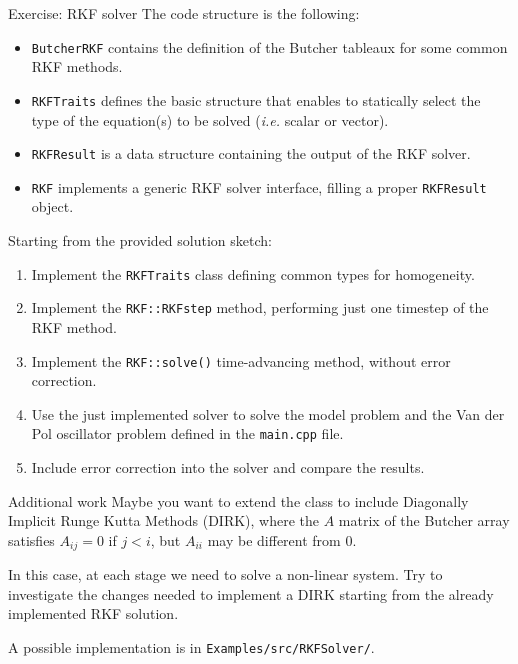 \documentclass[10pt]{beamer}
\begin{document}
\begin{frame}{Exercise: RKF solver}
The code structure is the following:
\begin{itemize}
\item \texttt{ButcherRKF} contains the definition of the Butcher tableaux for some common RKF methods.
\item \texttt{RKFTraits} defines the basic structure that enables to statically select the type of the equation(s) to be solved (\textit{i.e.} scalar or vector).
\item \texttt{RKFResult} is a data structure containing the output of the RKF solver.
\item \texttt{RKF} implements a generic RKF solver interface, filling a proper \texttt{RKFResult} object.
\end{itemize}
\vfill
Starting from the provided solution sketch:
\begin{enumerate}
\item Implement the \texttt{RKFTraits} class defining common types for homogeneity.
\item Implement the \texttt{RKF::RKFstep} method, performing just one timestep of the RKF method.
\item Implement the \texttt{RKF::solve()} time-advancing method, without error correction.
\item Use the just implemented solver to solve the model problem and the Van der Pol oscillator problem defined in the \texttt{main.cpp} file.
\item Include error correction into the solver and compare the results.
\end{enumerate}
\end{frame}
\begin{frame}{Additional work}
  Maybe you want to extend the class to include Diagonally Implicit Runge Kutta Methods
  (DIRK), where the $A$ matrix of the Butcher array satisfies $A_{ij}=0$ if $j<i$, but
  $A_{ii}$ may be different from $0$.
  \smallskip
  
  In this case, at each stage we need to solve a non-linear system. Try to investigate the changes needed to implement a DIRK starting from the already implemented RKF solution.
  \smallskip
  
  A possible implementation is in \texttt{Examples/src/RKFSolver/}.
\end{frame}
\end{document}
